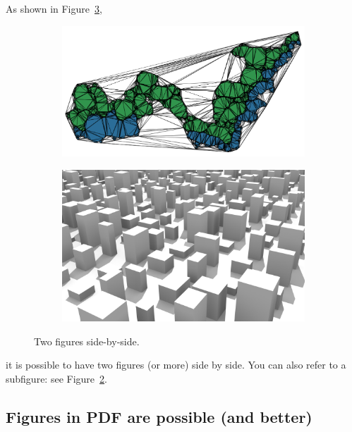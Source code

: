 As shown in Figure~\ref{fig:sidebyside},
\begin{figure}
  \centering
  \begin{subfigure}[b]{0.45\linewidth}
    \centering
    \includegraphics[width=\linewidth]{figs/sometriangles.png}
    \caption{}\label{fig:sidebyside:1}
  \end{subfigure}%
  \qquad %
  \begin{subfigure}[b]{0.45\linewidth}
    \centering
    \includegraphics[width=\linewidth]{figs/lod1.png}
    \caption{}\label{fig:sidebyside:2}
  \end{subfigure}%
  \caption{Two figures side-by-side.}\label{fig:sidebyside}
\end{figure}
it is possible to have two figures (or more) side by side.
You can also refer to a subfigure: see Figure~\ref{fig:sidebyside:2}.


\subsection{Figures in PDF are possible (and better)}

